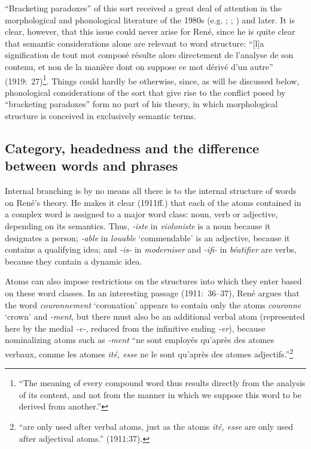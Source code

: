\documentclass[output=paper]{langsci/langscibook}
\begin{document}
``Bracketing paradoxes'' of this sort received a great deal of
attention in the morphological and phonological literature of the
1980s (e.g. \citealt{williams:heads}; \citealt{pesetsky:bracketing};
\citealt{spencer88:bracketing-paradoxes}) and later.  It is clear,
however, that this issue could never arise for René, since he is quite
clear that semantic considerations alone are relevant to word
structure: ``[l]a signification de tout mot composé résulte alors
directement de l'analyse de son contenu, et non de la manière dont on
suppose ce mot dérivé d'un autre'' (1919:~27)\footnote{``The meaning of
  every compound word thus results directly from the analysis of its
  content, and not from the manner in which we suppose this word to be
  derived from another.''}.  Things could hardly be otherwise, since,
as will be discussed below, phonological considerations of the sort
that give rise to the conflict posed by ``bracketing paradoxes'' form
no part of his theory, in which morphological structure is conceived in
exclusively semantic terms.

\subsection{Category, headedness and the difference between words
  and phrases}
\label{sec:headedness}

Internal branching is by no means all there is to the internal
structure of words on René's theory.  He makes it clear (1911ff.) that each of
the atoms contained in a complex word is assigned to a major word
class: noun, verb or adjective, depending on its semantics.  Thus,
\emph{-iste} in \emph{violoniste} is a noun because it designates a
person; \emph{-able} in \emph{louable} `commendable' is an adjective,
because it contains a qualifying idea; and \emph{-is-} in
\emph{moderniser} and \emph{-ifi-} in \emph{béatifier} are verbs,
because they contain a dynamic idea.

Atoms can also impose restrictions on the structures into which they
enter based on these word classes. In an interesting passage
(1911:~36--37), René argues that the word \emph{couronnement}
`coronation' appears to contain only the atoms \emph{couronne} `crown'
and \emph{-ment}, but there must also be an additional verbal atom
(represented here by the medial \emph{-e-}, reduced from the
infinitive ending \emph{-er}), because nominalizing atoms such as
\emph{-ment} ``ne sont employés qu'après des atomes verbaux, comme les
atomes \emph{ité, esse} ne le sont qu'après des atomes
adjectifs.''\footnote{``are only used after verbal atoms, just as the
  atoms \emph{ité, esse} are only used after adjectival atoms.''
  (1911:37).}
\end{document}
